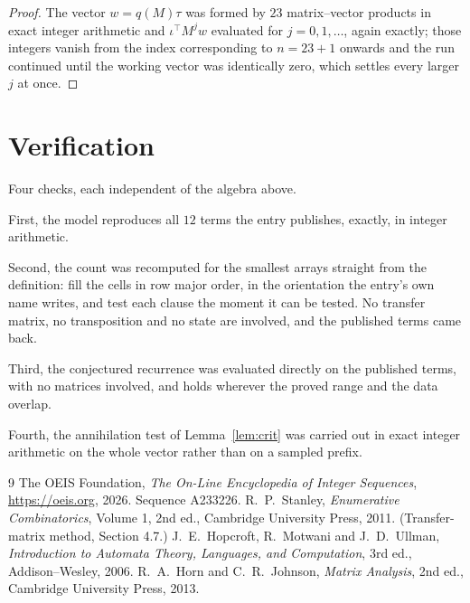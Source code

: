 \documentclass[11pt,a4paper]{article}
\theoremstyle{plain}
\theoremstyle{definition}
\begin{document}
\begin{proof}
The vector $w=q(M)\tau$ was formed by $23$ matrix--vector products in exact integer
arithmetic and $\iota^{\!\top}M^{j}w$ evaluated for $j=0,1,\dots$, again exactly; those
integers vanish from the index corresponding to $n=23+1$ onwards and the run continued
until the working vector was identically zero, which settles every larger $j$ at once.
\end{proof}

\section{Verification}

Four checks, each independent of the algebra above.

First, the model reproduces all $12$ terms the entry publishes, exactly, in integer
arithmetic.

Second, the count was recomputed for the smallest arrays straight from the definition: fill the
cells in row major order, in the orientation the entry's own name writes, and test each clause
the moment it can be tested. No transfer matrix, no transposition and no state are involved,
and the published terms came back.

Third, the conjectured recurrence was evaluated directly on the published terms, with no
matrices involved, and holds wherever the proved range and the data overlap.

Fourth, the annihilation test of Lemma~\ref{lem:crit} was carried out in exact integer
arithmetic on the whole vector rather than on a sampled prefix.

\begin{thebibliography}{9}
 The OEIS Foundation, \emph{The On-Line Encyclopedia of Integer
Sequences}, \url{https://oeis.org}, 2026. Sequence A233226.
 R.~P.~Stanley, \emph{Enumerative Combinatorics}, Volume 1, 2nd ed.,
Cambridge University Press, 2011. (Transfer-matrix method, Section 4.7.)
 J.~E.~Hopcroft, R.~Motwani and J.~D.~Ullman, \emph{Introduction to Automata
Theory, Languages, and Computation}, 3rd ed., Addison--Wesley, 2006.
 R.~A.~Horn and C.~R.~Johnson, \emph{Matrix Analysis}, 2nd ed., Cambridge
University Press, 2013.
\end{thebibliography}
\end{document}
